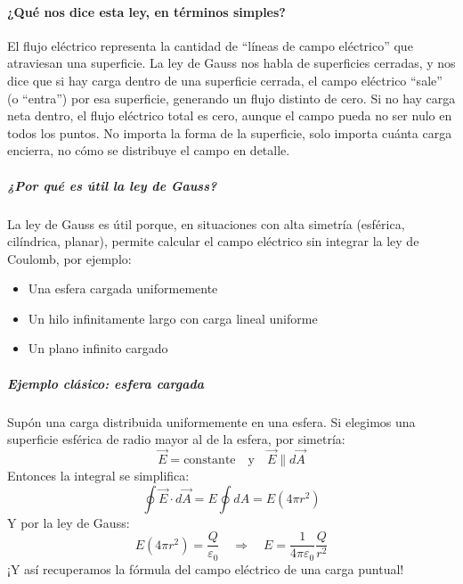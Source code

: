 \paragraph{¿Qué nos dice esta ley, en términos simples?}

El flujo eléctrico representa la cantidad de ``líneas de campo eléctrico'' que atraviesan una superficie. La ley de Gauss nos habla de superficies cerradas, y nos dice que si hay carga dentro de una superficie cerrada, el campo eléctrico ``sale'' (o ``entra'') por esa superficie, generando un flujo distinto de cero. Si no hay carga neta dentro, el flujo eléctrico total es cero, aunque el campo pueda no ser nulo en todos los puntos. No importa la forma de la superficie, solo importa cuánta carga encierra, no cómo se distribuye el campo en detalle.

\subparagraph{¿Por qué es útil la ley de Gauss?}

La ley de Gauss es útil porque, en situaciones con alta simetría (esférica, cilíndrica, planar), permite calcular el campo eléctrico sin integrar la ley de Coulomb, por ejemplo:
\begin{itemize}
    \item Una esfera cargada uniformemente
    \item Un hilo infinitamente largo con carga lineal uniforme
    \item Un plano infinito cargado
\end{itemize}

\subparagraph{Ejemplo clásico: esfera cargada}

Supón una carga distribuida uniformemente en una esfera. Si elegimos una superficie esférica de radio  mayor al de la esfera, por simetría:
\[
\vec{E} = \text{constante} \quad \text{y} \quad \vec{E} \parallel d\vec{A}
\]
Entonces la integral se simplifica:
\[
\oint \vec{E} \cdot d\vec{A} = E \oint dA = E(4\pi r^2)
\]
Y por la ley de Gauss:
\[
E(4\pi r^2) = \frac{Q}{\varepsilon_0} \quad \Rightarrow \quad E = \frac{1}{4\pi\varepsilon_0} \frac{Q}{r^2}
\]
¡Y así recuperamos la fórmula del campo eléctrico de una carga puntual!

